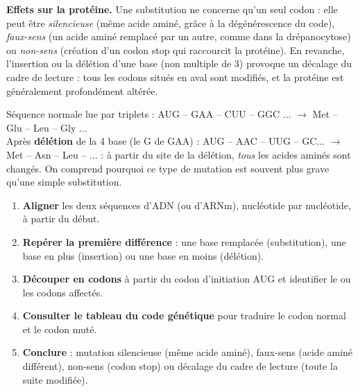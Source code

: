 \documentclass[11pt]{article}
\newcommand{\cle}[1]{{\popxbold\color{popdark}#1}}
\begin{document}
\textbf{Effets sur la protéine.} Une substitution ne concerne qu'un seul codon : elle peut être \emph{silencieuse} (même acide aminé, grâce à la dégénérescence du code), \emph{faux-sens} (un acide aminé remplacé par un autre, comme dans la drépanocytose) ou \emph{non-sens} (création d'un codon stop qui raccourcit la protéine). En revanche, l'insertion ou la délétion d'une base (non multiple de 3) provoque un \cle{décalage du cadre de lecture} : tous les codons situés en aval sont modifiés, et la protéine est généralement profondément altérée.

\begin{exemplebox}
Séquence normale lue par triplets : AUG -- GAA -- CUU -- GGC ... $\rightarrow$ Met -- Glu -- Leu -- Gly ...\\
Après \textbf{délétion} de la 4\ieme{} base (le G de GAA) : AUG -- AAC -- UUG -- GC... $\rightarrow$ Met -- Asn -- Leu -- ... : à partir du site de la délétion, \emph{tous} les acides aminés sont changés. On comprend pourquoi ce type de mutation est souvent plus grave qu'une simple substitution.
\end{exemplebox}

\begin{methode}
\begin{enumerate}
\item \textbf{Aligner} les deux séquences d'ADN (ou d'ARNm), nucléotide par nucléotide, à partir du début.
\item \textbf{Repérer la première différence} : une base remplacée (substitution), une base en plus (insertion) ou une base en moins (délétion).
\item \textbf{Découper en codons} à partir du codon d'initiation AUG et identifier le ou les codons affectés.
\item \textbf{Consulter le tableau du code génétique} pour traduire le codon normal et le codon muté.
\item \textbf{Conclure} : mutation silencieuse (même acide aminé), faux-sens (acide aminé différent), non-sens (codon stop) ou décalage du cadre de lecture (toute la suite modifiée).
\end{enumerate}
\end{methode}
\end{document}
